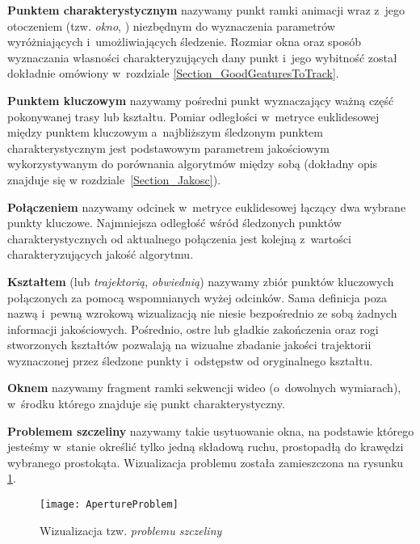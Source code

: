     \textbf{Punktem charakterystycznym} nazywamy punkt ramki animacji wraz z~jego otoczeniem (tzw. \textit{okno}, \cite{SalientPointsTracking05}) niezbędnym do wyznaczenia parametrów wyróżniających i~umożliwiających śledzenie. Rozmiar okna oraz sposób wyznaczania własności charakteryzujących dany punkt i~jego wybitność został dokładnie omówiony w~rozdziale \ref{Section_GoodGeaturesToTrack}.

    \textbf{Punktem kluczowym} nazywamy pośredni punkt wyznaczający ważną część pokonywanej trasy lub kształtu. Pomiar odległości w~metryce euklidesowej między punktem kluczowym a~najbliższym śledzonym punktem charakterystycznym jest podstawowym parametrem jakościowym wykorzystywanym do porównania algorytmów między sobą (dokładny opis znajduje się w rozdziale~\ref{Section_Jakosc}).

    \textbf{Połączeniem} nazywamy odcinek w~metryce euklidesowej łączący dwa wybrane punkty kluczowe. Najmniejsza odległość wśród śledzonych punktów charakterystycznych od aktualnego połączenia jest kolejną z~wartości charakteryzujących jakość algorytmu.

    \textbf{Kształtem} (lub \textit{trajektorią}, \textit{obwiednią}) nazywamy zbiór punktów kluczowych połączonych za pomocą wspomnianych wyżej odcinków. Sama definicja poza nazwą i~pewną wzrokową wizualizacją nie niesie bezpośrednio ze sobą żadnych informacji jakościowych. Pośrednio, ostre lub gładkie zakończenia oraz rogi stworzonych kształtów pozwalają na wizualne zbadanie jakości trajektorii wyznaczonej przez śledzone punkty i~odstępstw od oryginalnego kształtu.

    \textbf{Oknem} nazywamy fragment ramki sekwencji wideo (o~dowolnych wymiarach), w~środku którego znajduje się punkt charakterystyczny.

    \textbf{Problemem szczeliny} nazywamy takie usytuowanie okna, na podstawie którego jesteśmy w~stanie określić tylko jedną składową ruchu, prostopadłą do krawędzi wybranego prostokąta. Wizualizacja problemu została zamieszczona na rysunku \ref{fig:ApertureProblem}.

    \begin{figure}[!ht]
      \centering
      \texttt{[image: ApertureProblem]}
      \caption[Wizualizacja tzw. problemu szczeliny]{Wizualizacja tzw. \textit{problemu szczeliny}}
      \label{fig:ApertureProblem}
    \end{figure}

  \newpage
